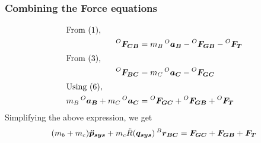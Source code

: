 \subsubsection{Combining the Force equations}
\begin{align*}
  \shortintertext{From (1),}
  \prescript{O}{}{\bm{F_{CB}}} &= m_B \prescript{O}{}{\bm{a_B}} - \prescript{O}{}{\bm{F_{GB}}} - \prescript{O}{}{\bm{F_{T}}} \\
  \shortintertext{From (3),}
  \prescript{O}{}{\bm{F_{BC}}} &= m_C \prescript{O}{}{\bm{a_C}} - \prescript{O}{}{\bm{F_{GC}}} \\
  \shortintertext{Using (6),}
  m_B \prescript{O}{}{\bm{a_B}} + m_C \prescript{O}{}{\bm{a_C}} &= \prescript{O}{}{\bm{F_{GC}}} + \prescript{O}{}{\bm{F_{GB}}} + \prescript{O}{}{\bm{F_{T}}} 
\end{align*}
Simplifying the above expression, we get
\begin{equation}
    (m_b + m_c) \bm{\ddot{p}_{sys}} + m_c \ddot{R}(\bm{q_{sys}}) \prescript{B}{}{\bm{r_{BC}}} = \bm{F_{GC}} + \bm{F_{GB}} + \bm{F_{T}} 
\end{equation}
